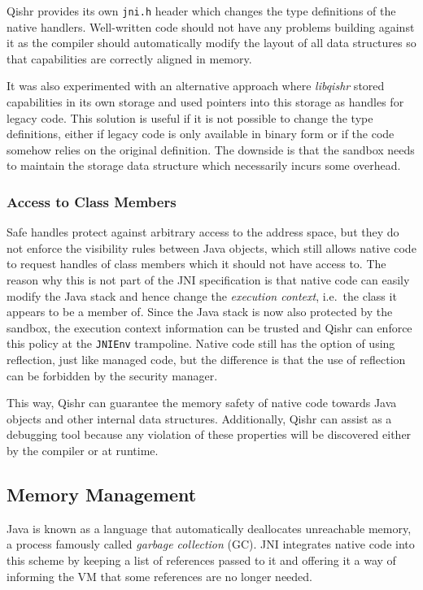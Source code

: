 \documentclass[a4paper,12pt,twoside,openright]{report}
\newcommand{\tool}[1]{\emph{#1}}
\newcommand{\lib}[1]{\tool{lib#1}}
\begin{document}
Qishr provides its own \texttt{jni.h} header which changes the type definitions of the native handlers. Well-written code should not have any problems building against it as the compiler should automatically modify the layout of all data structures so that capabilities are correctly aligned in memory.

It was also experimented with an alternative approach where \lib{qishr} stored capabilities in its own storage and used pointers into this storage as handles for legacy code. This solution is useful if it is not possible to change the type definitions, either if legacy code is only available in binary form or if the code somehow relies on the original definition. The downside is that the sandbox needs to maintain the storage data structure which necessarily incurs some overhead.

\subsubsection{Access to Class Members}

Safe handles protect against arbitrary access to the address space, but they do not enforce the visibility rules between Java objects, which still allows native code to request handles of class members which it should not have access to. The reason why this is not part of the JNI specification is that native code can easily modify the Java stack and hence change the \emph{execution context}, i.e.\ the class it appears to be a member of. Since the Java stack is now also protected by the sandbox, the execution context information can be trusted and Qishr can enforce this policy at the \texttt{JNIEnv} trampoline. Native code still has the option of using reflection, just like managed code, but the difference is that the use of reflection can be forbidden by the security manager.

This way, Qishr can guarantee the memory safety of native code towards Java objects and other internal data structures. Additionally, Qishr can assist as a debugging tool because any violation of these properties will be discovered either by the compiler or at runtime.

\subsection{Memory Management}

Java is known as a language that automatically deallocates unreachable memory, a process famously called \emph{garbage collection} (GC). JNI integrates native code into this scheme by keeping a list of references passed to it and offering it a way of informing the VM that some references are no longer needed. 
\end{document}
